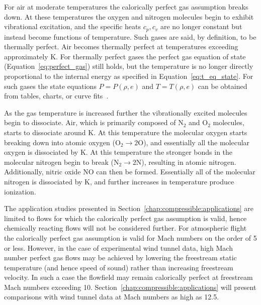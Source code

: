 For air at moderate temperatures the calorically perfect gas assumption breaks down.   At these temperatures the oxygen and nitrogen molecules begin to exhibit vibrational excitation, and the specific heats $c_p, c_v$ are no longer constant but instead become functions of temperature.  Such gases are said, by definition, to be thermally perfect.  Air becomes thermally perfect at temperatures exceeding approximately \unit[800]{K}.  For thermally perfect gases the perfect gas equation of state (Equation~\eqref{eq:perfect_gas}) still holds, but the temperature is no longer directly proportional to the internal energy as specified in Equation~\eqref{eq:t_eq_state}.  For such gases the state equations $P=P(\rho,e)$ and $T=T(\rho,e)$ can be obtained from tables, charts, or curve fits~\cite{tannehill_curve_fits}.

As the gas temperature is increased further the vibrationally excited molecules begin to dissociate.  Air, which is primarily composed of N$_2$ and O$_2$ molecules, starts to dissociate around \unit[2000]{K}.  At this temperature the molecular oxygen starts breaking down into atomic oxygen (O$_2 \rightarrow 2$O), and essentially all the molecular oxygen is dissociated by \unit[4000]{K}.  At this temperature the stronger bonds in the molecular nitrogen begin to break (N$_2 \rightarrow 2$N), resulting in atomic nitrogen.  Additionally, nitric oxide NO can then be formed.  Essentially all of the molecular nitrogen is dissociated by \unit[9000]{K}, and further increases in temperature produce ionization.   

The application studies presented in Section~\ref{chap:compressible:applications} are limited to flows for which the calorically perfect gas assumption is valid, hence chemically reacting flows will not be considered further.   For atmospheric flight the calorically perfect gas assumption is valid for Mach numbers on the order of 5 or less.  However, in the case of experimental wind tunnel data, high Mach number perfect gas flows may be achieved by lowering the freestream static temperature (and hence speed of sound) rather than increasing freestream velocity.  In such a case the flowfield may remain calorically perfect at freestream Mach numbers exceeding 10.  Section~\ref{chap:compressible:applications} will present comparisons with wind tunnel data at Mach numbers as high as 12.5.    


